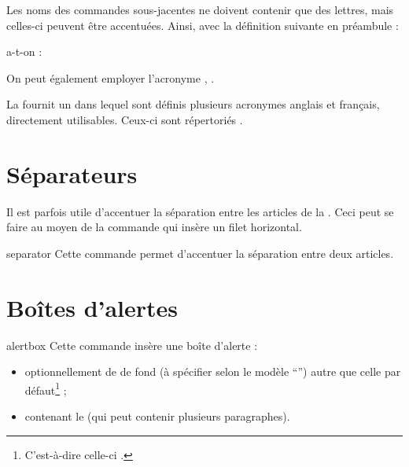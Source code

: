 \documentclass{letgut}
\begin{document}
Les noms des commandes sous-jacentes ne doivent contenir que des lettres, mais
celles-ci peuvent être accentuées. Ainsi, avec la définition suivante en
préambule :

\begin{ltx-code}[title addon=définition d'acronyme avec lettres
  accentuées,drop lifted shadow]
\end{ltx-code}

a-t-on :

\begin{ltx-code-result}[title addon=utilisation d'acronyme avec lettres accentuées,listing options app={deletekeywords={[3]{l}}}]
On peut également employer l'acronyme , .
\end{ltx-code-result}

La  fournit un  dans lequel sont définis
plusieurs acronymes anglais et français, directement utilisables. Ceux-ci sont
répertoriés .

\section{Séparateurs}
\label{sec:filets}

Il est parfois utile d'accentuer la séparation entre les articles de la
. Ceci peut se faire au moyen de la commande  qui
insère un filet horizontal.

\begin{docCommand}{separator}{}
  Cette commande permet d'accentuer la séparation entre deux articles.
\end{docCommand}

\section{Boîtes d'alertes}
\label{sec:boites-dalertes}

\begin{docCommand}{alertbox}{  }
  Cette commande insère une boîte d'alerte :
  \begin{itemize}
  \item optionnellement de  de fond (à spécifier selon le modèle
    \enquote{}) autre que celle par défaut\footnote{C'est-à-dire
      \colorbox{letgut_default_alert_box_color}{celle-ci}%
      .} ;
  \item contenant le  (qui peut contenir plusieurs paragraphes).
  \end{itemize}
\end{docCommand}
\end{document}
